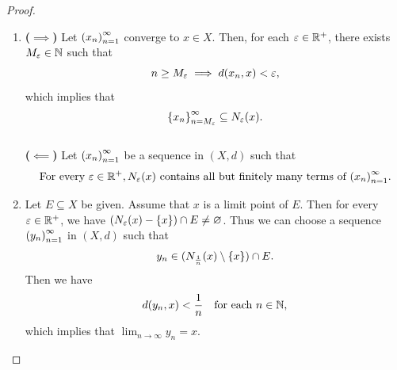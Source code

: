 \begin{proof}
    \begin{enumerate}[label=\textbf{(\Alph*)}]
        \item \textbf{($\implies$)} Let $\paren*{x_{n}}_{n = 1}^{\infty}$ converge to $x \in X$. Then, for each
        $\veps \in \R^{+}$, there exists $M_{\veps} \in \N$ such that
        \[
        n \geq M_{\veps} \implies d(x_{n}, x) < \veps,
        \]
        which implies that
        \[
        \set*{x_{n}}_{n = M_{\veps}}^{\infty} \subseteq N_{\veps}(x).
        \]
        \\[6mm]
        \textbf{($\impliedby$)} Let $\paren*{x_{n}}_{n = 1}^{\infty}$ be a sequence in $(X, d)$ such that
        \[
        \text{For every } \veps \in \R^{+}, N_{\veps}(x) \text{ contains all but
        finitely many terms of } \paren*{x_{n}}_{n = 1}^{\infty}.
        \]
        \item Let $E \subseteq X$ be given. Assume that $x$ is a limit point of $E$. Then for every $\veps \in
        \R^{+}$, we have $(N_{\veps}(x) - \set*{x}) \cap E \neq \vnot$. Thus we can choose a sequence
        $\paren*{y_{n}}_{n = 1}^{\infty}$ in $(X, d)$ such that
        \[
        y_{n} \in (N_{\frac{1}{n}}(x) \setminus \set*{x}) \cap E.
        \]
        Then we have
        \[
        d(y_{n}, x) < \frac{1}{n} \quad \text{for each } n \in \N,
        \]
        which implies that $\lim_{n \to \infty} y_{n} = x$.
    \end{enumerate}
\end{proof}


